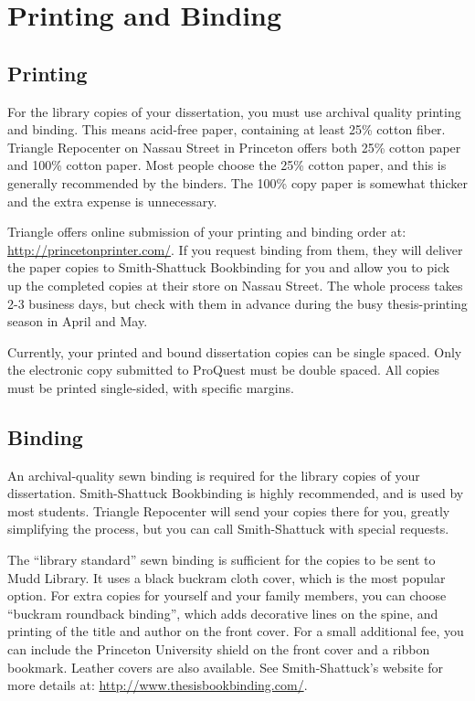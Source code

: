 \chapter{Printing and Binding\label{ch:printing}}

\section{Printing}

For the library copies of your dissertation, you must use archival quality printing and binding. This means acid-free paper, containing at least 25\% cotton fiber. Triangle Repocenter on Nassau Street in Princeton offers both 25\% cotton paper and 100\% cotton paper. Most people choose the 25\% cotton paper, and this is generally recommended by the binders. The 100\% copy paper is somewhat thicker and the extra expense is unnecessary.

Triangle offers online submission of your printing and binding order at: \url{http://princetonprinter.com/}. If you request binding from them, they will deliver the paper copies to Smith-Shattuck Bookbinding for you and allow you to pick up the completed copies at their store on Nassau Street. The whole process takes 2-3 business days, but check with them in advance during the busy thesis-printing season in April and May.

Currently, your printed and bound dissertation copies can be single spaced. Only the electronic copy submitted to ProQuest must be double spaced. All copies must be printed single-sided, with specific margins.

\section{Binding}

An archival-quality sewn binding is required for the library copies of your dissertation. Smith-Shattuck Bookbinding is highly recommended, and is used by most students. Triangle Repocenter will send your copies there for you, greatly simplifying the process, but you can call Smith-Shattuck with special requests.

The ``library standard'' sewn binding is sufficient for the copies to be sent to Mudd Library. It uses a black buckram cloth cover, which is the most popular option. For extra copies for yourself and your family members, you can choose ``buckram roundback binding'', which adds decorative lines on the spine, and printing of the title and author on the front cover. For a small additional fee, you can include the Princeton University shield on the front cover and a ribbon bookmark. Leather covers are also available. See Smith-Shattuck's website for more details at: \url{http://www.thesisbookbinding.com/}.
